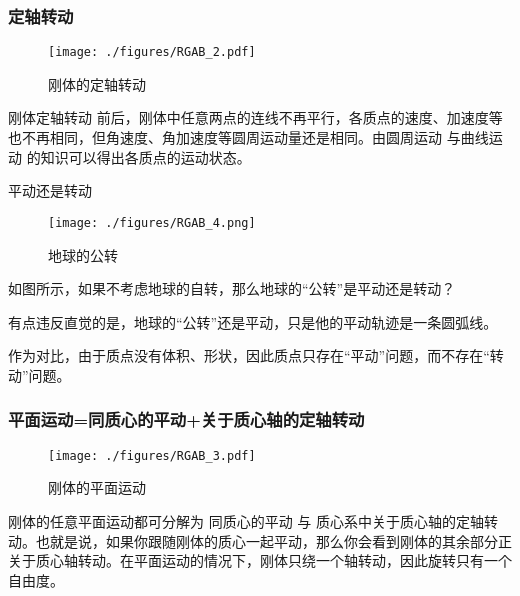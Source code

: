 \subsubsection{定轴转动}
\begin{figure}[ht]
\centering
\texttt{[image: ./figures/RGAB\_2.pdf]}
\caption{刚体的定轴转动} \label{RGAB_fig2}
\end{figure}
刚体定轴转动 前后，刚体中任意两点的连线不再平行，各质点的速度、加速度等也不再相同，但角速度、角加速度等圆周运动量还是相同。由圆周运动 与曲线运动  的知识可以得出各质点的运动状态。

\begin{example}{平动还是转动}
\begin{figure}[ht]
\centering
\texttt{[image: ./figures/RGAB\_4.png]}
\caption{地球的公转} \label{RGAB_fig4}
\end{figure}
如图所示，如果不考虑地球的自转，那么地球的“公转”是平动还是转动？

有点违反直觉的是，地球的“公转”还是平动，只是他的平动轨迹是一条圆弧线。
\end{example}
作为对比，由于质点没有体积、形状，因此质点只存在“平动”问题，而不存在“转动”问题。

\subsubsection{平面运动=同质心的平动+关于质心轴的定轴转动}
\begin{figure}[ht]
\centering
\texttt{[image: ./figures/RGAB\_3.pdf]}
\caption{刚体的平面运动} \label{RGAB_fig3}
\end{figure}
刚体的任意平面运动都可分解为 同质心的平动 与 质心系中关于质心轴的定轴转动。也就是说，如果你跟随刚体的质心一起平动，那么你会看到刚体的其余部分正关于质心轴转动。在平面运动的情况下，刚体只绕一个轴转动，因此旋转只有一个自由度。



